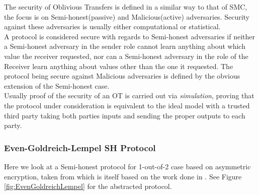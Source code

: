 \documentclass[a4paper,10pt]{article}
\begin{document}
				The security of Oblivious Transfers is defined in a similar way to that of SMC, the focus is on Semi-honest(passive) and Malicious(active) adversaries. Security against these adversaries is usually either computational or statistical.\\

				A protocol is considered secure with regards to Semi-honest adversaries if neither a Semi-honest adversary in the sender role cannot learn anything about which value the receiver requested, nor can a Semi-honest adversary in the role of the Receiver learn anything about values other than the one it requested. The protocol being secure against Malicious adversaries is defined by the obvious extension of the Semi-honest case.\\

				Usually proof of the security of an OT is carried out via \emph{simulation}, proving that the protocol under consideration is equivalent to the ideal model with a trusted third party taking both parties inputs and sending the proper outputs to each party.

			\subsubsection{Even-Goldreich-Lempel SH Protocol}
				Here we look at a Semi-honest protocol for 1-out-of-2 case based on asymmetric encryption, taken from \cite{PinkasSlides2014} which is itself based on the work done in \cite{EvenEtAl85}. See Figure \ref{fig:EvenGoldreichLempel} for the abstracted protocol.
\end{document}
